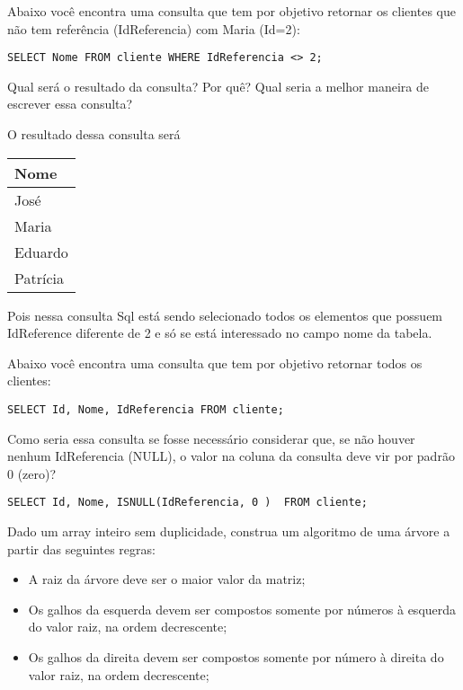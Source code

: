 \documentclass[a4 paper]{article}
\begin{document}
Abaixo você encontra uma consulta que tem por objetivo retornar os clientes que não tem referência (IdReferencia)
com Maria (Id=2):

\begin{verbatim}
SELECT Nome FROM cliente WHERE IdReferencia <> 2;    
\end{verbatim}

Qual será o resultado da consulta? Por quê? Qual seria a melhor maneira de escrever essa consulta?

O resultado dessa consulta será 

\begin{tabular}{|l|}
\hline
Nome     \\ \hline
José     \\ \hline
Maria    \\ \hline
Eduardo  \\ \hline
Patrícia \\ \hline
\end{tabular}

Pois nessa consulta Sql está sendo selecionado todos os elementos que possuem IdReference diferente de 2 e só se está interessado no campo nome da tabela. 

\vspace{5mm}

Abaixo você encontra uma consulta que tem por objetivo retornar todos os clientes:

\begin{verbatim}
SELECT Id, Nome, IdReferencia FROM cliente;    
\end{verbatim}

Como seria essa consulta se fosse necessário considerar que, se não houver nenhum IdReferencia (NULL), o valor na coluna da consulta deve vir por padrão 0 (zero)?

\begin{verbatim}
SELECT Id, Nome, ISNULL(IdReferencia, 0 )  FROM cliente;
\end{verbatim}

\vspace{5mm}

Dado um array inteiro sem duplicidade, construa um algoritmo de uma árvore a partir das seguintes regras:

\begin{itemize}
    \item A raiz da árvore deve ser o maior valor da matriz;
    \item Os galhos da esquerda devem ser compostos somente por números à esquerda do valor raiz, na ordem decrescente;
    \item Os galhos da direita devem ser compostos somente por número à direita do valor raiz, na ordem
decrescente;
\end{itemize}
\end{document}
